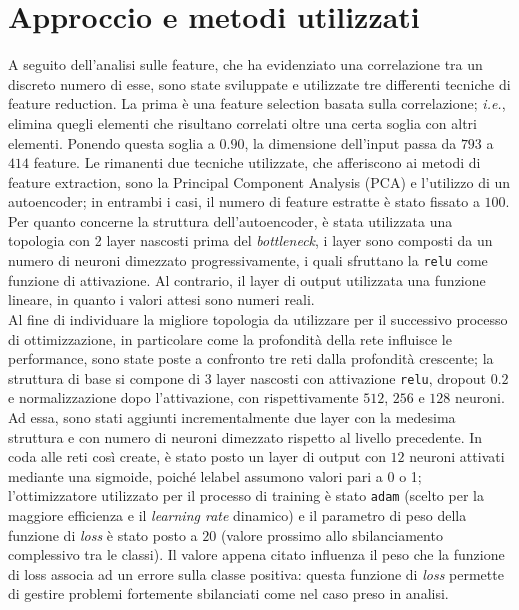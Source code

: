 \section{Approccio e metodi utilizzati}
A seguito dell'analisi sulle feature, che ha evidenziato una correlazione tra un discreto numero di esse, sono state sviluppate e utilizzate tre differenti tecniche di feature reduction. 
La prima è una feature selection basata sulla correlazione; \textit{i.e.}, elimina quegli elementi che risultano correlati oltre una certa soglia con altri elementi. 
Ponendo questa soglia a $0.90$, la dimensione dell'input passa da $793$ a $414$ feature.
Le rimanenti due tecniche utilizzate, che afferiscono ai metodi di feature extraction, sono la Principal Component Analysis (PCA) e l'utilizzo di un autoencoder; in entrambi i casi, il numero di feature estratte è stato fissato a $100$.
Per quanto concerne la struttura dell'autoencoder, è stata utilizzata una topologia con 2 layer nascosti prima del \textit{bottleneck}, i layer sono composti da un numero di neuroni dimezzato progressivamente, i quali sfruttano la \texttt{relu} come funzione di attivazione. 
Al contrario, il layer di output utilizzata una funzione lineare, in quanto i valori attesi sono numeri reali.\\
Al fine di individuare la migliore topologia da utilizzare per il successivo processo di ottimizzazione, in particolare come la profondità della rete influisce le performance, sono state poste a confronto tre reti dalla profondità crescente; la struttura di base si compone di $3$ layer nascosti con attivazione \texttt{relu}, dropout $0.2$ e normalizzazione dopo l'attivazione, con rispettivamente $512$, $256$ e $128$ neuroni. 
Ad essa, sono stati aggiunti incrementalmente due layer con la medesima struttura e con numero di neuroni dimezzato rispetto al livello precedente. %
In coda alle reti così create, è stato posto un layer di output con $12$ neuroni attivati mediante una sigmoide, poiché lelabel assumono valori pari a 0 o 1; l'ottimizzatore utilizzato per il processo di training è stato \texttt{adam} (scelto per la maggiore efficienza e il \textit{learning rate} dinamico) e il parametro di peso della funzione di \textit{loss} è stato posto a $20$ (valore prossimo allo sbilanciamento complessivo tra le classi). 
Il valore appena citato influenza il peso che la funzione di loss associa ad un errore sulla classe positiva: questa funzione di \textit{loss} permette di gestire problemi fortemente sbilanciati come nel caso preso in analisi.

